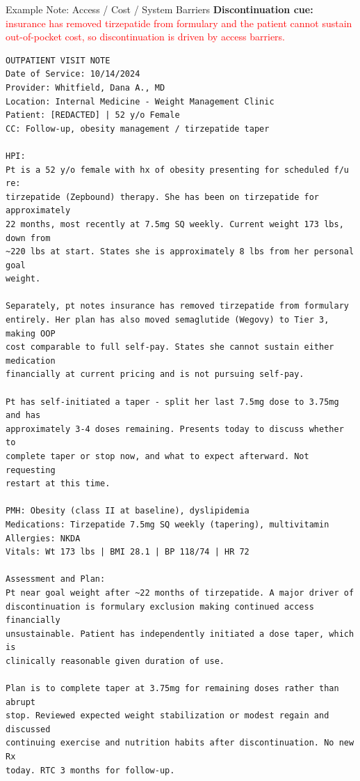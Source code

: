 \documentclass[aspectratio=169]{beamer}
\begin{document}
\begin{frame}{Example Note: Access / Cost / System Barriers}
\tiny
\textbf{Discontinuation cue:}
\textcolor{red}{insurance has removed tirzepatide from formulary and the patient cannot sustain out-of-pocket cost, so discontinuation is driven by access barriers.}

\vspace{0.5em}
\begin{verbatim}
OUTPATIENT VISIT NOTE
Date of Service: 10/14/2024
Provider: Whitfield, Dana A., MD
Location: Internal Medicine - Weight Management Clinic
Patient: [REDACTED] | 52 y/o Female
CC: Follow-up, obesity management / tirzepatide taper

HPI:
Pt is a 52 y/o female with hx of obesity presenting for scheduled f/u re:
tirzepatide (Zepbound) therapy. She has been on tirzepatide for approximately
22 months, most recently at 7.5mg SQ weekly. Current weight 173 lbs, down from
~220 lbs at start. States she is approximately 8 lbs from her personal goal
weight.

Separately, pt notes insurance has removed tirzepatide from formulary
entirely. Her plan has also moved semaglutide (Wegovy) to Tier 3, making OOP
cost comparable to full self-pay. States she cannot sustain either medication
financially at current pricing and is not pursuing self-pay.

Pt has self-initiated a taper - split her last 7.5mg dose to 3.75mg and has
approximately 3-4 doses remaining. Presents today to discuss whether to
complete taper or stop now, and what to expect afterward. Not requesting
restart at this time.

PMH: Obesity (class II at baseline), dyslipidemia
Medications: Tirzepatide 7.5mg SQ weekly (tapering), multivitamin
Allergies: NKDA
Vitals: Wt 173 lbs | BMI 28.1 | BP 118/74 | HR 72

Assessment and Plan:
Pt near goal weight after ~22 months of tirzepatide. A major driver of
discontinuation is formulary exclusion making continued access financially
unsustainable. Patient has independently initiated a dose taper, which is
clinically reasonable given duration of use.

Plan is to complete taper at 3.75mg for remaining doses rather than abrupt
stop. Reviewed expected weight stabilization or modest regain and discussed
continuing exercise and nutrition habits after discontinuation. No new Rx
today. RTC 3 months for follow-up.
\end{verbatim}
\end{frame}
\end{document}
